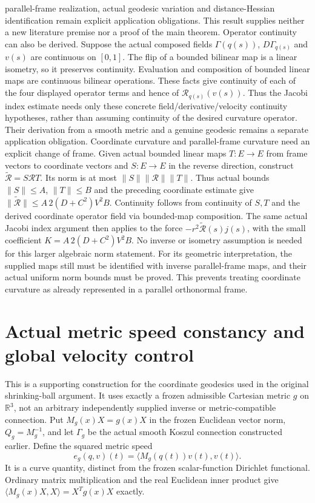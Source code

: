 \documentclass[11pt]{article}
\theoremstyle{definition}
\theoremstyle{remark}
\numberwithin{equation}{section}
\begin{document}
parallel-frame realization, actual geodesic variation and distance-Hessian
identification remain explicit application obligations. This result supplies
neither a new literature premise nor a proof of the main theorem.
\label{expanded:coordinate-curvature-continuity}
Operator continuity can also be derived. Suppose the actual composed fields
$\Gamma(q(s))$, $D\Gamma_{q(s)}$ and $v(s)$ are continuous on $[0,1]$.
The flip of a bounded bilinear map is a linear isometry, so it preserves
continuity. Evaluation and composition of bounded linear maps are continuous
bilinear operations. These facts give continuity of each of the four displayed
operator terms and hence of $\mathcal R_{q(s)}(v(s))$. Thus the Jacobi index
estimate needs only these concrete field/derivative/velocity continuity
hypotheses, rather than assuming continuity of the desired curvature operator.
Their derivation from a smooth metric and a genuine geodesic remains a
separate application obligation.
\label{expanded:coordinate-curvature-transport}
Coordinate curvature and parallel-frame curvature need an explicit change of
frame. Given actual bounded linear maps $T:E\to E$ from frame vectors to
coordinate vectors and $S:E\to E$ in the reverse direction, construct
$\widetilde{\mathcal R}=S\mathcal R T$. Its norm is at most
$\|S\|\|\mathcal R\|\|T\|$. Thus actual bounds $\|S\|\le A$,
$\|T\|\le B$ and the preceding coordinate estimate give
$\|\widetilde{\mathcal R}\|\le A\,2(D+C^2)V^2 B$.
Continuity follows from continuity of $S,T$ and the derived coordinate
operator field via bounded-map composition. The same actual Jacobi index
argument then applies to the force $-r^2\widetilde{\mathcal R}(s)j(s)$,
with the small coefficient $K=A\,2(D+C^2)V^2 B$.
No inverse or isometry assumption is needed for this larger algebraic norm
statement. For its geometric interpretation, the supplied maps still must
be identified with inverse parallel-frame maps, and their actual uniform
norm bounds must be proved. This prevents treating coordinate curvature as
already represented in a parallel orthonormal frame.

\clearpage
\section{Actual metric speed constancy and global velocity control}
\label{expanded:metric-geodesic-energy}
This is a supporting construction for the coordinate geodesics used in the
original shrinking-ball argument. It uses exactly a frozen admissible
Cartesian metric $g$ on $\mathbb R^3$, not an arbitrary independently supplied
inverse or metric-compatible connection. Put $M_g(x)X=g(x)X$ in the frozen
Euclidean vector norm, $Q_g=M_g^{-1}$, and let $\Gamma_g$ be the actual smooth
Koszul connection constructed earlier. Define the squared metric speed
\[
 e_g(q,v)(t)=\langle M_g(q(t))v(t),v(t)\rangle.
\]
It is a curve quantity, distinct from the frozen scalar-function Dirichlet
functional. Ordinary matrix multiplication and the real Euclidean inner
product give $\langle M_g(x)X,X\rangle=X^Tg(x)X$ exactly.
\end{document}
